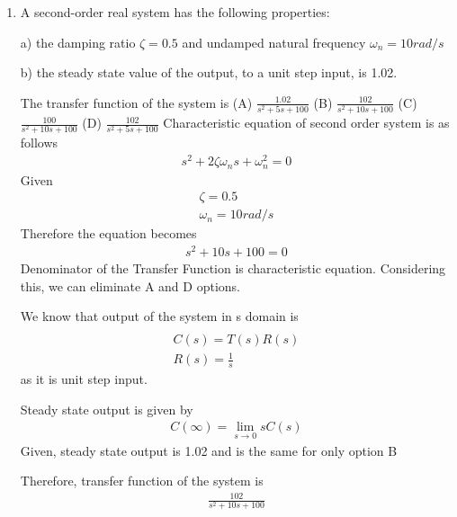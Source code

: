 \begin{enumerate}[label=\thesection.\arabic*.,ref=\thesection.\theenumi]

\item A second-order real system has the following properties:

a) the damping ratio $\zeta=0.5$ and undamped natural frequency $\omega_n=10rad/s$ 

b) the steady state value of the output, to a unit step input, is 1.02.

The transfer function of the system is\newline
(A) $\frac{1.02}{s^2+5s+100}$    (B) $\frac{102}{s^2+10s+100}$\newline
(C) $\frac{100}{s^2+10s+100}$  (D) $\frac{102}{s^2+5s+100}$ \newline
\solution Characteristic equation of second order system is as follows
\newline
\begin{align}
s^2+2\zeta\omega_ns+\omega_n^2=0
\end{align}
Given
\begin{align}
\zeta=0.5
\\
\omega_n=10rad/s
\end{align}
Therefore the equation becomes 
\begin{align}
 s^2+10s+100=0   
\end{align}
Denominator of the Transfer Function is characteristic equation. Considering this, we can eliminate A and D options.\newline

We know that output of the system in s domain is
\begin{align}\\
C(s)=T(s)R(s)
\\
R(s)=\frac{1}{s}
\end{align}
as it is unit step input.\newline

Steady state output is given by
\begin{align}
    C(\infty)=\lim_{s \to 0}sC(s)
\end{align}
Given, steady state output is 1.02 and is the same for only option B\newline

Therefore, transfer function of the system is
\begin{align}
    \frac{102}{s^2+10s+100}
\end{align}

\end{enumerate}
